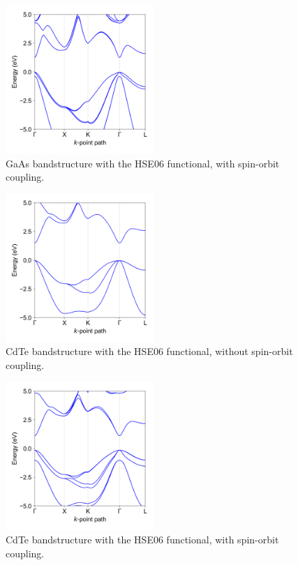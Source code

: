 \begin{figure}[htb] \centering
\includegraphics[width=0.5\textwidth]{./figures/ap2/GaAs_hybrid_SoC.png}
\caption[GaAs bandstructure, HSE06, SoC]{GaAs bandstructure with the HSE06 functional, with spin-orbit coupling. }
\end{figure}

\clearpage

\begin{figure}[htb] \centering
\includegraphics[width=0.5\textwidth]{./figures/ap2/CdTe_hybrid.png}
\caption[CdTe bandstructure, HSE06, no-SoC]{CdTe bandstructure with the HSE06 functional, without spin-orbit coupling. }
\end{figure}

\begin{figure}[htb] \centering
\includegraphics[width=0.5\textwidth]{./figures/ap2/CdTe_hybrid_SoC.png}
\caption[CdTe bandstructure, HSE06, SoC]{CdTe bandstructure with the HSE06 functional, with spin-orbit coupling. }
\end{figure}
